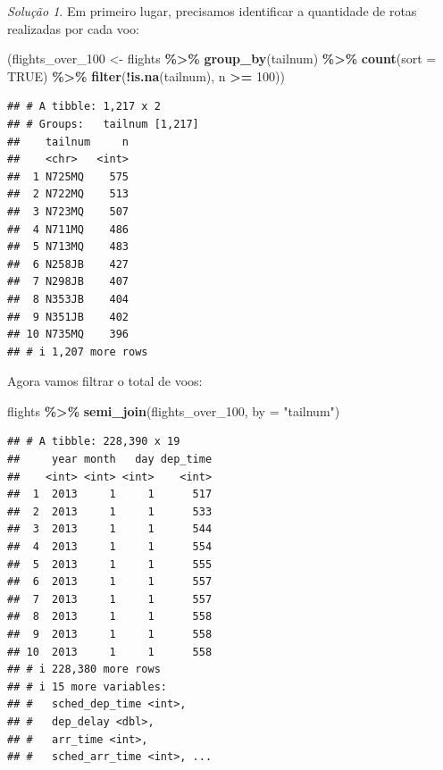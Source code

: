 \documentclass[
]{latex/krantz}
\newenvironment{Shaded}{\begin{snugshade}}{\end{snugshade}}
\newcommand{\AttributeTok}[1]{\textcolor[rgb]{0.13,0.29,0.53}{#1}}
\newcommand{\ConstantTok}[1]{\textcolor[rgb]{0.56,0.35,0.01}{#1}}
\newcommand{\DecValTok}[1]{\textcolor[rgb]{0.00,0.00,0.81}{#1}}
\newcommand{\FunctionTok}[1]{\textcolor[rgb]{0.13,0.29,0.53}{\textbf{#1}}}
\newcommand{\NormalTok}[1]{#1}
\newcommand{\OtherTok}[1]{\textcolor[rgb]{0.56,0.35,0.01}{#1}}
\newcommand{\SpecialCharTok}[1]{\textcolor[rgb]{0.81,0.36,0.00}{\textbf{#1}}}
\newcommand{\StringTok}[1]{\textcolor[rgb]{0.31,0.60,0.02}{#1}}
\theoremstyle{definition}
\theoremstyle{definition}
\theoremstyle{definition}
\theoremstyle{definition}
\theoremstyle{remark}
\newtheorem*{solution}{Solução}
\begin{document}
\begin{solution}

Em primeiro lugar, precisamos identificar a quantidade de rotas realizadas por cada voo:

\begin{Shaded}
\begin{Highlighting}[]
\NormalTok{(flights\_over\_100 }\OtherTok{\textless{}{-}}\NormalTok{ flights }\SpecialCharTok{\%\textgreater{}\%}
  \FunctionTok{group\_by}\NormalTok{(tailnum) }\SpecialCharTok{\%\textgreater{}\%}
  \FunctionTok{count}\NormalTok{(}\AttributeTok{sort =} \ConstantTok{TRUE}\NormalTok{) }\SpecialCharTok{\%\textgreater{}\%}
  \FunctionTok{filter}\NormalTok{(}\SpecialCharTok{!}\FunctionTok{is.na}\NormalTok{(tailnum), n }\SpecialCharTok{\textgreater{}=} \DecValTok{100}\NormalTok{))}
\end{Highlighting}
\end{Shaded}

\begin{verbatim}
## # A tibble: 1,217 x 2
## # Groups:   tailnum [1,217]
##    tailnum     n
##    <chr>   <int>
##  1 N725MQ    575
##  2 N722MQ    513
##  3 N723MQ    507
##  4 N711MQ    486
##  5 N713MQ    483
##  6 N258JB    427
##  7 N298JB    407
##  8 N353JB    404
##  9 N351JB    402
## 10 N735MQ    396
## # i 1,207 more rows
\end{verbatim}

Agora vamos filtrar o total de voos:

\begin{Shaded}
\begin{Highlighting}[]
\NormalTok{flights }\SpecialCharTok{\%\textgreater{}\%}
  \FunctionTok{semi\_join}\NormalTok{(flights\_over\_100, }\AttributeTok{by =} \StringTok{"tailnum"}\NormalTok{)}
\end{Highlighting}
\end{Shaded}

\begin{verbatim}
## # A tibble: 228,390 x 19
##     year month   day dep_time
##    <int> <int> <int>    <int>
##  1  2013     1     1      517
##  2  2013     1     1      533
##  3  2013     1     1      544
##  4  2013     1     1      554
##  5  2013     1     1      555
##  6  2013     1     1      557
##  7  2013     1     1      557
##  8  2013     1     1      558
##  9  2013     1     1      558
## 10  2013     1     1      558
## # i 228,380 more rows
## # i 15 more variables:
## #   sched_dep_time <int>,
## #   dep_delay <dbl>,
## #   arr_time <int>,
## #   sched_arr_time <int>, ...
\end{verbatim}

\end{solution}
\end{document}
